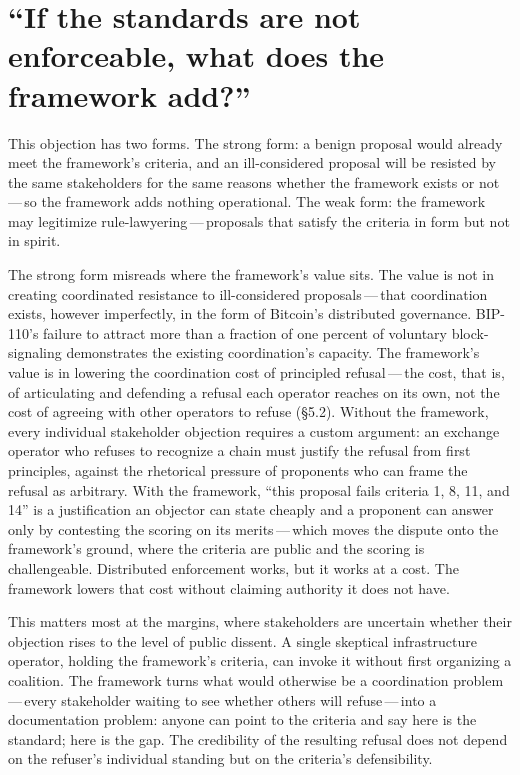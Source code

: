 \documentclass[11pt, twoside, openright]{book}
\newcommand{\sect}[1]{\S#1}
\begin{document}
\section{\texorpdfstring{``If the standards are not enforceable, what does the framework add?''}{\textquotedblleft If the standards are not enforceable, what does the framework add?\textquotedblright}}

This objection has two forms. The strong form: a benign proposal would already meet the framework's criteria, and an ill-considered proposal will be resisted by the same stakeholders for the same reasons whether the framework exists or not\,---\,so the framework adds nothing operational. The weak form: the framework may legitimize rule-lawyering\,---\,proposals that satisfy the criteria in form but not in spirit.

The strong form misreads where the framework's value sits. The value is not in creating coordinated resistance to ill-considered proposals\,---\,that coordination exists, however imperfectly, in the form of Bitcoin's distributed governance. BIP-110's failure to attract more than a fraction of one percent of voluntary block-signaling demonstrates the existing coordination's capacity. The framework's value is in lowering the coordination cost of principled refusal\,---\,the cost, that is, of articulating and defending a refusal each operator reaches on its own, not the cost of agreeing with other operators to refuse (\sect{5.2}). Without the framework, every individual stakeholder objection requires a custom argument: an exchange operator who refuses to recognize a chain must justify the refusal from first principles, against the rhetorical pressure of proponents who can frame the refusal as arbitrary. With the framework, ``this proposal fails criteria 1, 8, 11, and 14'' is a justification an objector can state cheaply and a proponent can answer only by contesting the scoring on its merits\,---\,which moves the dispute onto the framework's ground, where the criteria are public and the scoring is challengeable. Distributed enforcement works, but it works at a cost. The framework lowers that cost without claiming authority it does not have.

This matters most at the margins, where stakeholders are uncertain whether their objection rises to the level of public dissent. A single skeptical infrastructure operator, holding the framework's criteria, can invoke it without first organizing a coalition. The framework turns what would otherwise be a coordination problem\,---\,every stakeholder waiting to see whether others will refuse\,---\,into a documentation problem: anyone can point to the criteria and say here is the standard; here is the gap. The credibility of the resulting refusal does not depend on the refuser's individual standing but on the criteria's defensibility.
\end{document}
